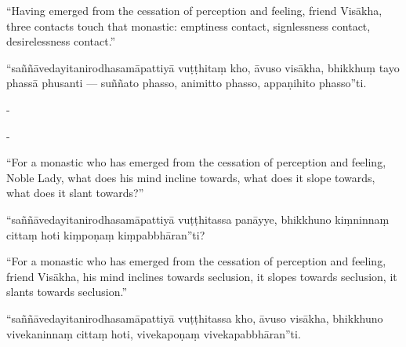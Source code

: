 \begin{samepage}
\begin{leftcolumn*}
“Having emerged from the cessation of perception and feeling, friend Visākha, three contacts touch that monastic: emptiness contact, signlessness contact, desirelessness contact.”
\end{leftcolumn*}

\begin{rightcolumn}
“saññāvedayitanirodhasamāpattiyā vuṭṭhitaṃ kho, āvuso visākha, bhikkhuṃ tayo phassā phusanti — suññato phasso, animitto phasso, appaṇihito phasso”ti.
\end{rightcolumn}
\end{samepage}

\begin{samepage}
\begin{leftcolumn*}
-
\end{leftcolumn*}

\begin{rightcolumn}
-
\end{rightcolumn}
\end{samepage}

\begin{samepage}
\begin{leftcolumn*}
“For a monastic who has emerged from the cessation of perception and feeling, Noble Lady, what does his mind incline towards, what does it slope towards, what does it slant towards?”
\end{leftcolumn*}

\begin{rightcolumn}
“saññāvedayitanirodhasamāpattiyā vuṭṭhitassa panāyye, bhikkhuno kiṃninnaṃ cittaṃ hoti kiṃpoṇaṃ kiṃpabbhāran”ti?
\end{rightcolumn}
\end{samepage}

\begin{samepage}
\begin{leftcolumn*}
“For a monastic who has emerged from the cessation of perception and feeling, friend Visākha, his mind inclines towards seclusion, it slopes towards seclusion, it slants towards seclusion.”
\end{leftcolumn*}

\begin{rightcolumn}
“saññāvedayitanirodhasamāpattiyā vuṭṭhitassa kho, āvuso visākha, bhikkhuno vivekaninnaṃ cittaṃ hoti, vivekapoṇaṃ vivekapabbhāran”ti.
\end{rightcolumn}
\end{samepage}

